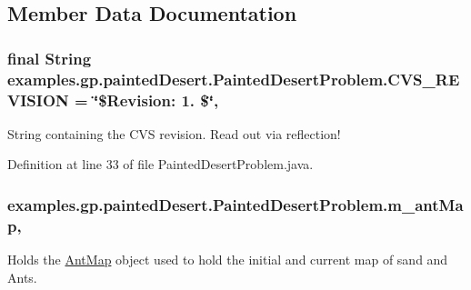 \subsection{Member Data Documentation}
\hypertarget{classexamples_1_1gp_1_1painted_desert_1_1_painted_desert_problem_a8adf656b91e5eb446a29520bdddaa302}{
\subsubsection[{C\-V\-S\-\_\-\-R\-E\-V\-I\-S\-I\-O\-N}]{\setlength{\rightskip}{0pt plus 5cm}final String examples.\-gp.\-painted\-Desert.\-Painted\-Desert\-Problem.\-C\-V\-S\-\_\-\-R\-E\-V\-I\-S\-I\-O\-N = \char`\"{}\$Revision\-: 1. \$\char`\"{}\hspace{0.3cm}{\ttfamily [static]}, {\ttfamily [private]}}}\label{classexamples_1_1gp_1_1painted_desert_1_1_painted_desert_problem_a8adf656b91e5eb446a29520bdddaa302}
String containing the C\-V\-S revision. Read out via reflection! 

Definition at line 33 of file Painted\-Desert\-Problem.\-java.

\hypertarget{classexamples_1_1gp_1_1painted_desert_1_1_painted_desert_problem_a84ab65c2498356537f9a1ac59d2f4ffb}{
\subsubsection[{m\-\_\-ant\-Map}]{ examples.\-gp.\-painted\-Desert.\-Painted\-Desert\-Problem.\-m\-\_\-ant\-Map\hspace{0.3cm}{\ttfamily [static]}, {\ttfamily [private]}}}\label{classexamples_1_1gp_1_1painted_desert_1_1_painted_desert_problem_a84ab65c2498356537f9a1ac59d2f4ffb}
Holds the \hyperlink{classexamples_1_1gp_1_1painted_desert_1_1_ant_map}{Ant\-Map} object used to hold the initial and current map of sand and Ants. 

